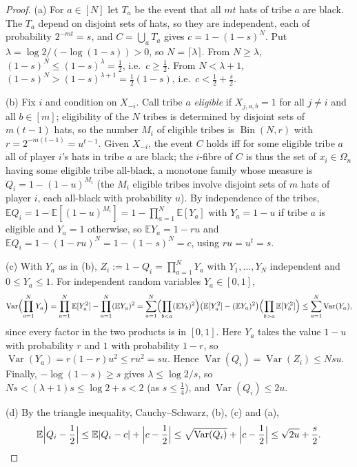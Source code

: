 \documentclass[11pt,a4paper]{article}
\theoremstyle{plain}
\theoremstyle{definition}
\theoremstyle{remark}
\newcommand{\E}{\mathbb E}
\DeclareMathOperator{\Var}{Var}
\DeclareMathOperator{\Bin}{Bin}
\newcommand{\Om}{\Omega}
\begin{document}
\label{pf:tribes}
\lemtribes*
\begin{proof}
(a) For $a\in[N]$ let $T_a$ be the event that all $mt$ hats of tribe $a$ are black. The $T_a$ depend on disjoint sets of hats, so they are independent, each of probability $2^{-mt}=s$, and $C=\bigcup_aT_a$ gives $c=1-(1-s)^N$. Put $\lambda=\log2/(-\log(1-s))>0$, so $N=\lceil\lambda\rceil$. From $N\ge\lambda$, $(1-s)^N\le(1-s)^\lambda=\frac12$, i.e.\ $c\ge\frac12$. From $N<\lambda+1$, $(1-s)^N>(1-s)^{\lambda+1}=\frac12(1-s)$, i.e.\ $c<\frac12+\frac s2$.

(b) Fix $i$ and condition on $X_{-i}$. Call tribe $a$ \emph{eligible} if $X_{j,a,b}=1$ for all $j\ne i$ and all $b\in[m]$; eligibility of the $N$ tribes is determined by disjoint sets of $m(t-1)$ hats, so the number $M_i$ of eligible tribes is $\Bin(N,r)$ with $r=2^{-m(t-1)}=u^{t-1}$. Given $X_{-i}$, the event $C$ holds iff for some eligible tribe $a$ all of player $i$'s hats in tribe $a$ are black; the $i$-fibre of $C$ is thus the set of $x_i\in\Om_n$ having some eligible tribe all-black, a monotone family whose measure is $Q_i=1-(1-u)^{M_i}$ (the $M_i$ eligible tribes involve disjoint sets of $m$ hats of player $i$, each all-black with probability $u$). By independence of the tribes, $\E Q_i=1-\E[(1-u)^{M_i}]=1-\prod_{a=1}^N\E[Y_a]$ with $Y_a=1-u$ if tribe $a$ is eligible and $Y_a=1$ otherwise, so $\E Y_a=1-ru$ and $\E Q_i=1-(1-ru)^N=1-(1-s)^N=c$, using $ru=u^t=s$.

(c) With $Y_a$ as in (b), $Z_i:=1-Q_i=\prod_{a=1}^NY_a$ with $Y_1,\dots,Y_N$ independent and $0\le Y_a\le1$. For independent random variables $Y_a\in[0,1]$,
\[
 \Var\Bigl(\prod_{a=1}^NY_a\Bigr)=\prod_{a=1}^N\E[Y_a^2]-\prod_{a=1}^N(\E Y_a)^2
 =\sum_{a=1}^N\Bigl(\prod_{b<a}(\E Y_b)^2\Bigr)\bigl(\E[Y_a^2]-(\E Y_a)^2\bigr)\Bigl(\prod_{b>a}\E[Y_b^2]\Bigr)\le\sum_{a=1}^N\Var(Y_a),
\]
since every factor in the two products is in $[0,1]$. Here $Y_a$ takes the value $1-u$ with probability $r$ and $1$ with probability $1-r$, so $\Var(Y_a)=r(1-r)u^2\le ru^2=su$. Hence $\Var(Q_i)=\Var(Z_i)\le Nsu$. Finally, $-\log(1-s)\ge s$ gives $\lambda\le\log2/s$, so $Ns<(\lambda+1)s\le\log2+s<2$ (as $s\le\frac14$), and $\Var(Q_i)\le2u$.

(d) By the triangle inequality, Cauchy--Schwarz, (b), (c) and (a),
\[
 \E\Bigl|Q_i-\frac12\Bigr|\le\E|Q_i-c|+\Bigl|c-\frac12\Bigr|\le\sqrt{\Var(Q_i)}+\Bigl|c-\frac12\Bigr|\le\sqrt{2u}+\frac s2. \qedhere
\]
\end{proof}
\end{document}
